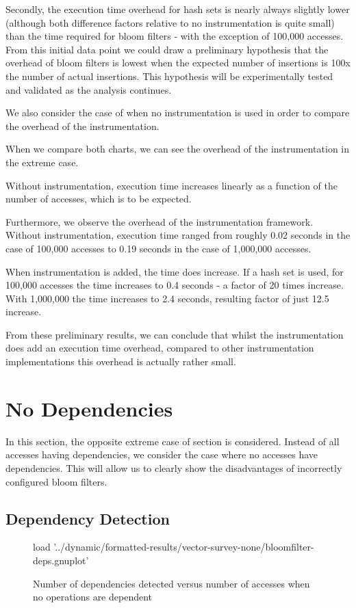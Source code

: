 	Secondly, the execution time overhead for hash sets is nearly always slightly lower (although both difference factors relative to no instrumentation is quite small) than the time required for bloom filters - with the exception of 100,000 accesses. From this initial data point we could draw a preliminary hypothesis that the overhead of bloom filters is lowest when the expected number of insertions is 100x the number of actual insertions. This hypothesis will be experimentally tested and validated as the analysis continues.
	
	We also consider the case of when no instrumentation is used in order to compare the overhead of the instrumentation.
	
	When we compare both charts, we can see the overhead of the instrumentation in the extreme case.
	
	Without instrumentation, execution time increases linearly as a function of the number of accesses, which is to be expected.
	
	Furthermore, we observe the overhead of the instrumentation framework. Without instrumentation, execution time ranged from roughly 0.02 seconds in the case of 100,000 accesses to 0.19 seconds in the case of 1,000,000 accesses.
	
	When instrumentation is added, the time does increase. If a hash set is used, for 100,000 accesses the time increases to 0.4 seconds - a factor of 20 times increase. With 1,000,000 the time increases to 2.4 seconds, resulting factor of just 12.5 increase.
	
	From these preliminary results, we can conclude that whilst the instrumentation does add an execution time overhead, compared to other instrumentation implementations this overhead is actually rather small.
	
\section{No Dependencies} \label{sec:results/none}
	In this section, the opposite extreme case of section \label{sec:results/all} is considered. Instead of all accesses having dependencies, we consider the case where no accesses have dependencies. This will allow us to clearly show the disadvantages of incorrectly configured bloom filters.

	\subsection{Dependency Detection} \label{sec:results/none/deps}
	\begin{figure}
		\centering
		\begin{gnuplot}[terminal=pdf]
		load '../dynamic/formatted-results/vector-survey-none/bloomfilter-deps.gnuplot'
		\end{gnuplot}
		\caption{Number of dependencies detected versus number of accesses when no operations are dependent}
		\label{chart:none-dep}
	\end{figure}
	
